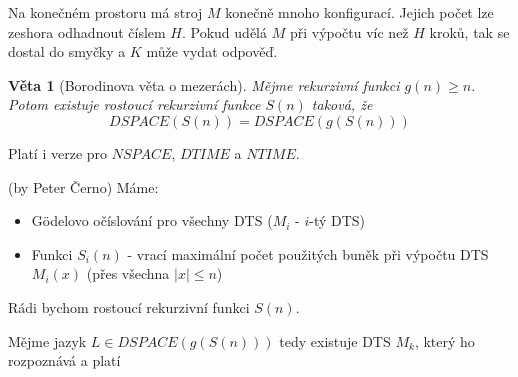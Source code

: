 \documentclass[a4paper]{article}      %
\newtheorem{theorem}{Věta}[section]
\newenvironment{proof}[1][Důkaz]{\begin{trivlist}
\item[\hskip \labelsep {\bfseries #1}]}{\end{trivlist}}
\newenvironment{remark}[1][Pozorování]{\begin{trivlist}
\item[\hskip \labelsep {\bfseries #1}]}{\end{trivlist}}
\begin{document}
\begin{remark}
Na konečném prostoru má stroj $M$ konečně mnoho konfigurací. Jejich počet lze zeshora odhadnout číslem $H$.
Pokud udělá $M$ při výpočtu víc než $H$ kroků, tak se dostal do smyčky a $K$ může vydat odpověď. 
\end{remark}

\begin{theorem}[Borodinova věta o mezerách]
Mějme rekurzivní funkci $g(n)\geq n$. Potom existuje rostoucí rekurzivní funkce $S(n)$ taková, že
\[
DSPACE(S(n))=DSPACE(g(S(n)))
\]
\end{theorem}

Platí i verze pro $NSPACE$, $DTIME$ a $NTIME$.

\begin{proof}(by Peter Černo)
Máme:
\begin{itemize}
\item G\"{o}delovo očíslování pro všechny DTS ($M_{i}$ - $i$-tý DTS)
\item Funkci $S_{i}(n)$ - vrací maximální počet použitých buněk při výpočtu DTS $M_{i}(x)$ (přes všechna $|x|\leq n$)
\end{itemize}
Rádi bychom rostoucí rekurzivní funkci $S(n)$.

Mějme jazyk $L\in DSPACE(g(S(n)))$ tedy existuje DTS $M_{k}$, který ho rozpoznává a platí 

\end{proof}
\end{document}
